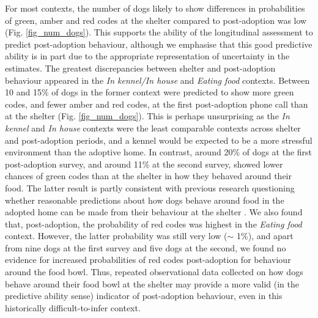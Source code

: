 \documentclass[fleqn,10pt]{wlscirep}
\begin{document}
For most contexts, the number of dogs likely to show differences in probabilities of green, amber and red codes at the shelter compared to post-adoption was low (Fig. \ref{fig_num_dogs}). This supports the ability of the longitudinal assessment to predict post-adoption behaviour, although we emphasise that this good predictive ability is in part due to the appropriate representation of uncertainty in the estimates. The greatest discrepancies between shelter and post-adoption behaviour appeared in the \textit{In kennel/In house} and \textit{Eating food} contexts. Between 10 and 15\% of dogs in the former context were predicted to show more green codes, and fewer amber and red codes, at the first post-adoption phone call than at the shelter (Fig. \ref{fig_num_dogs}). This is perhaps unsurprising as the \textit{In kennel} and \textit{In house} contexts were the least comparable contexts across shelter and post-adoption periods, and a kennel would be expected to be a more stressful environment than the adoptive home. In contrast, around 20\% of dogs at the first post-adoption survey, and around 11\% at the second survey, showed lower chances of green codes than at the shelter in how they behaved around their food. The latter result is partly consistent with previous research questioning whether reasonable predictions about how dogs behave around food in the adopted home can be made from their behaviour at the shelter \cite{marder2013,mohangibbons2012,clay2020behaviour}. We also found that, post-adoption, the probability of red codes was highest in the \textit{Eating food} context. However, the latter probability was still very low ($\sim$ 1\%), and apart from nine dogs at the first survey and five dogs at the second, we found no evidence for increased probabilities of red codes post-adoption for behaviour around the food bowl. Thus, repeated observational data collected on how dogs behave around their food bowl at the shelter may provide a more valid (in the predictive ability sense) indicator of post-adoption behaviour, even in this historically difficult-to-infer context.
\end{document}
